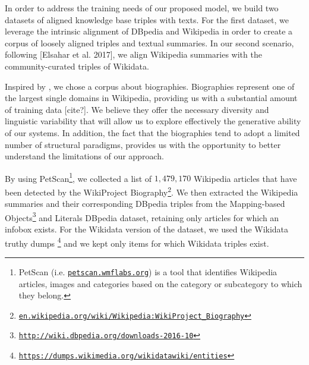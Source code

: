 \documentclass[preprint,5p]{elsarticle}
\begin{document}
In order to address the training needs of our proposed model, we build two datasets of aligned knowledge base triples with texts. For the first dataset, we leverage the intrinsic alignment of DBpedia and Wikipedia in order to create a corpus of loosely aligned triples and textual summaries. In our second scenario, following [Elsahar et al. 2017], we align Wikipedia summaries with the community-curated triples of Wikidata.

Inspired by \citeauthor{Lebret2016} , we chose a corpus about biographies. Biographies represent one of the largest single domains in Wikipedia, providing us with a substantial amount of training data [cite?]. We believe they offer the necessary diversity and linguistic variability that will allow us to explore effectively the generative ability of our systems. In addition, the fact that the biographies tend to adopt a limited number of structural paradigms, provides us with the opportunity to better understand the limitations of our approach.



By using PetScan\footnote{PetScan (i.e. \href{https://petscan.wmflabs.org/}{\texttt{petscan.wmflabs.org}}) is a tool that identifies Wikipedia articles, images and categories based on the category or subcategory to which they belong.}, we collected a list of $1,479,170$ Wikipedia articles that have been detected by the WikiProject Biography\footnote{\href{https://en.wikipedia.org/wiki/Wikipedia:WikiProject_Biography}{\texttt{en.wikipedia.org/wiki/Wikipedia:WikiProject\_Biography}}}. We then extracted the Wikipedia summaries and their corresponding DBpedia triples from the Mapping-based Objects\footnote{\label{dbpedia.org}\href{http://wiki.dbpedia.org/downloads-2016-10}{\texttt{http://wiki.dbpedia.org/downloads-2016-10}}} and Literals DBpedia dataset, retaining only articles for which an infobox exists. For the Wikidata version of the dataset, we used the Wikidata truthy dumps \footnote{\href{https://dumps.wikimedia.org/wikidatawiki/entities}{\texttt{https://dumps.wikimedia.org/wikidatawiki/entities}}} and we kept only items for which Wikidata triples exist.
\end{document}
